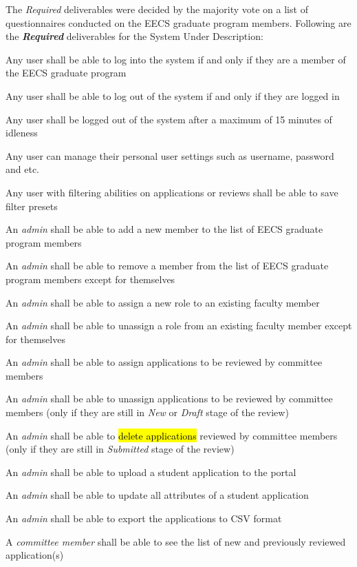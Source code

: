 \documentclass[fontsize=12pt,paper=letter,twoside]{scrartcl}
\begin{document}
The \emph{Required} deliverables were decided by the majority vote on a list of questionnaires conducted on the EECS graduate program members. Following are the \textbf{\emph{Required}} deliverables for the System Under Description:\\

\begin{mylist}
\item Any user shall be able to log into the system if and only if they are a member of the EECS graduate program
\item Any user shall be able to log out of the system if and only if they are logged in
\item Any user shall be logged out of the system after a maximum of 15 minutes of idleness
\item Any user can manage their personal user settings such as username, password and etc.
\item Any user with filtering abilities on applications or reviews shall be able to save filter presets
\item An \emph{admin} shall be able to add a new member to the list of EECS graduate program members
\item An \emph{admin} shall be able to remove a member from the list of EECS graduate program members except for themselves
\item An \emph{admin} shall be able to assign a new role to an existing faculty member
\item An \emph{admin} shall be able to unassign a role from an existing faculty member except for themselves
\item An \emph{admin} shall be able to assign applications to be reviewed by committee members
\item An \emph{admin} shall be able to unassign applications to be reviewed by committee members (only if they are still in \emph{New} or \emph{Draft} stage of the review)
\item An \emph{admin} shall be able to \hl{delete applications} reviewed by committee members (only if they are still in \emph{Submitted} stage of the review)
\item An \emph{admin} shall be able to upload a student application to the portal
\item An \emph{admin} shall be able to update all attributes of a student application
\item An \emph{admin} shall be able to export the applications to CSV format
\item A \emph{committee member} shall be able to see the list of new and previously reviewed application(s)

\end{mylist}
\end{document}
